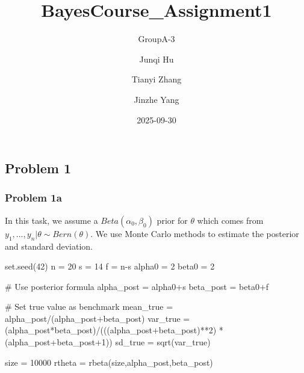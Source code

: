 \documentclass[
  letterpaper,
  DIV=11,
  numbers=noendperiod]{scrartcl}
\title{BayesCourse\_Assignment1}
\subtitle{GroupA-3}
\author{Junqi Hu \and Tianyi Zhang \and Jinzhe Yang}
\date{2025-09-30}
\newenvironment{Shaded}{\begin{snugshade}}{\end{snugshade}}
\newcommand{\CommentTok}[1]{\textcolor[rgb]{0.37,0.37,0.37}{#1}}
\newcommand{\DecValTok}[1]{\textcolor[rgb]{0.68,0.00,0.00}{#1}}
\newcommand{\FunctionTok}[1]{\textcolor[rgb]{0.28,0.35,0.67}{#1}}
\newcommand{\NormalTok}[1]{\textcolor[rgb]{0.00,0.23,0.31}{#1}}
\newcommand{\OtherTok}[1]{\textcolor[rgb]{0.00,0.23,0.31}{#1}}
\newcommand{\SpecialCharTok}[1]{\textcolor[rgb]{0.37,0.37,0.37}{#1}}
\renewcommand*\contentsname{Table of contents}
\newcommand\contentsname{Table of contents}
\begin{document}
\maketitle

\renewcommand*\contentsname{Table of contents}
{
\hypersetup{linkcolor=}
\setcounter{tocdepth}{3}
\tableofcontents
}

\subsection{Problem 1}\label{problem-1}

\subsubsection{Problem 1a}\label{problem-1a}

In this task, we assume a \(Beta(\alpha_0,\beta_0)\) prior for
\(\theta\) which comes from \(y_1,...,y_n|\theta\sim Bern(\theta)\). We
use Monte Carlo methods to estimate the posterior and standard
deviation.

\begin{Shaded}
\begin{Highlighting}[]
\FunctionTok{set.seed}\NormalTok{(}\DecValTok{42}\NormalTok{)}
\NormalTok{n }\OtherTok{=} \DecValTok{20}
\NormalTok{s }\OtherTok{=} \DecValTok{14}
\NormalTok{f }\OtherTok{=}\NormalTok{ n}\SpecialCharTok{{-}}\NormalTok{s}
\NormalTok{alpha0 }\OtherTok{=} \DecValTok{2}
\NormalTok{beta0 }\OtherTok{=} \DecValTok{2}

\CommentTok{\# Use posterior formula }
\NormalTok{alpha\_post }\OtherTok{=}\NormalTok{ alpha0}\SpecialCharTok{+}\NormalTok{s}
\NormalTok{beta\_post }\OtherTok{=}\NormalTok{ beta0}\SpecialCharTok{+}\NormalTok{f}

\CommentTok{\# Set true value as benchmark}
\NormalTok{mean\_true }\OtherTok{=}\NormalTok{ alpha\_post}\SpecialCharTok{/}\NormalTok{(alpha\_post}\SpecialCharTok{+}\NormalTok{beta\_post)}
\NormalTok{var\_true }\OtherTok{=}\NormalTok{ (alpha\_post}\SpecialCharTok{*}\NormalTok{beta\_post)}\SpecialCharTok{/}\NormalTok{(((alpha\_post}\SpecialCharTok{+}\NormalTok{beta\_post)}\SpecialCharTok{**}\DecValTok{2}\NormalTok{) }\SpecialCharTok{*}\NormalTok{ (alpha\_post}\SpecialCharTok{+}\NormalTok{beta\_post}\SpecialCharTok{+}\DecValTok{1}\NormalTok{))}
\NormalTok{sd\_true }\OtherTok{=} \FunctionTok{sqrt}\NormalTok{(var\_true)}

\NormalTok{size }\OtherTok{=} \DecValTok{10000}
\NormalTok{rtheta }\OtherTok{=} \FunctionTok{rbeta}\NormalTok{(size,alpha\_post,beta\_post)}
\end{Highlighting}
\end{Shaded}
\end{document}
